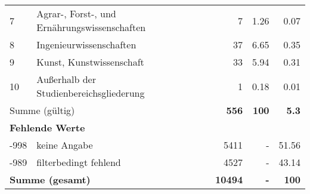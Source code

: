 \begin{longtable}{lXrrr}
     7 &
     \multicolumn{1}{X}{ Agrar-, Forst-, und Ernährungswissenschaften   } &


       \num{7} &
       \num[round-mode=places,round-precision=2]{1,26} &
         \num[round-mode=places,round-precision=2]{0,07} \\

     8 &
     \multicolumn{1}{X}{ Ingenieurwissenschaften   } &


       \num{37} &
       \num[round-mode=places,round-precision=2]{6,65} &
         \num[round-mode=places,round-precision=2]{0,35} \\

     9 &
     \multicolumn{1}{X}{ Kunst, Kunstwissenschaft   } &


       \num{33} &
       \num[round-mode=places,round-precision=2]{5,94} &
         \num[round-mode=places,round-precision=2]{0,31} \\

     10 &
     \multicolumn{1}{X}{ Außerhalb der Studienbereichsgliederung   } &


       \num{1} &
       \num[round-mode=places,round-precision=2]{0,18} &
         \num[round-mode=places,round-precision=2]{0,01} \\
     \midrule
     \multicolumn{2}{l}{Summe (gültig)} &
       \textbf{\num{556}} &
     \textbf{100} &
       \textbf{\num[round-mode=places,round-precision=2]{5,3}} \\
     \multicolumn{5}{l}{\textbf{Fehlende Werte}}\\
       -998 &
       keine Angabe &
         \num{5411} &
        - &
         \num[round-mode=places,round-precision=2]{51,56} \\
       -989 &
       filterbedingt fehlend &
         \num{4527} &
        - &
         \num[round-mode=places,round-precision=2]{43,14} \\
     \midrule
     \multicolumn{2}{l}{\textbf{Summe (gesamt)}} &
          \textbf{\num{10494}} &
        \textbf{-} &
        \textbf{100} \\
     \bottomrule
     \end{longtable}
     
